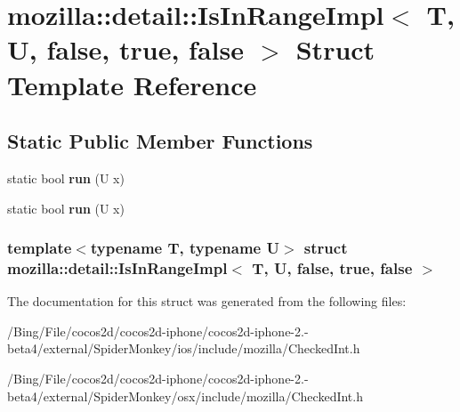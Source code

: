 \hypertarget{structmozilla_1_1detail_1_1_is_in_range_impl_3_01_t_00_01_u_00_01false_00_01true_00_01false_01_4}{\section{mozilla\-:\-:detail\-:\-:Is\-In\-Range\-Impl$<$ T, U, false, true, false $>$ Struct Template Reference}
\label{structmozilla_1_1detail_1_1_is_in_range_impl_3_01_t_00_01_u_00_01false_00_01true_00_01false_01_4}
}
\subsection*{Static Public Member Functions}
\begin{DoxyCompactItemize}
\item 
\hypertarget{structmozilla_1_1detail_1_1_is_in_range_impl_3_01_t_00_01_u_00_01false_00_01true_00_01false_01_4_a3987ce941c05c8c6f63e9bcc7aa9a4e3}{static bool {\bfseries run} (U x)}\label{structmozilla_1_1detail_1_1_is_in_range_impl_3_01_t_00_01_u_00_01false_00_01true_00_01false_01_4_a3987ce941c05c8c6f63e9bcc7aa9a4e3}

\item 
\hypertarget{structmozilla_1_1detail_1_1_is_in_range_impl_3_01_t_00_01_u_00_01false_00_01true_00_01false_01_4_a3987ce941c05c8c6f63e9bcc7aa9a4e3}{static bool {\bfseries run} (U x)}\label{structmozilla_1_1detail_1_1_is_in_range_impl_3_01_t_00_01_u_00_01false_00_01true_00_01false_01_4_a3987ce941c05c8c6f63e9bcc7aa9a4e3}

\end{DoxyCompactItemize}
\subsubsection*{template$<$typename T, typename U$>$ struct mozilla\-::detail\-::\-Is\-In\-Range\-Impl$<$ T, U, false, true, false $>$}



The documentation for this struct was generated from the following files\-:\begin{DoxyCompactItemize}
\item 
/\-Bing/\-File/cocos2d/cocos2d-\/iphone/cocos2d-\/iphone-\/2.-\/beta4/external/\-Spider\-Monkey/ios/include/mozilla/Checked\-Int.\-h\item 
/\-Bing/\-File/cocos2d/cocos2d-\/iphone/cocos2d-\/iphone-\/2.-\/beta4/external/\-Spider\-Monkey/osx/include/mozilla/Checked\-Int.\-h\end{DoxyCompactItemize}
